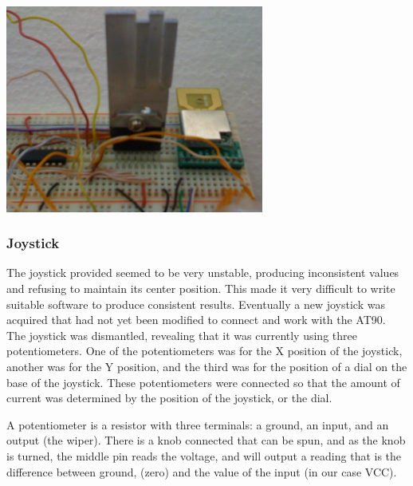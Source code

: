 \begin{center}
  \includegraphics[width=85mm]{imageSources/designProblemsHBridgeHeatsink.png}
\end{center}
\label{HBridgeHeatsink}

\subsubsection{Joystick}
\label{sec:JoystickConst}
The joystick provided seemed to be very unstable, producing inconsistent values and refusing to maintain its center position. This made it very difficult to write suitable software to produce consistent results. Eventually a new joystick was acquired that had not yet been modified to connect and work with the AT90. The joystick was dismantled, revealing that it was currently using three potentiometers. One of the potentiometers was for the X position of the joystick, another was for the Y position, and the third was for the position of a dial on the base of the joystick. These potentiometers were connected so that the amount of current was determined by the position of the joystick, or the dial.

A potentiometer is a resistor with three terminals: a ground, an input, and an output (the wiper). There is a knob connected that can be spun, and as the knob is turned, the middle pin reads the voltage, and will output a reading that is the difference between ground, (zero) and the value of the input (in our case VCC).

